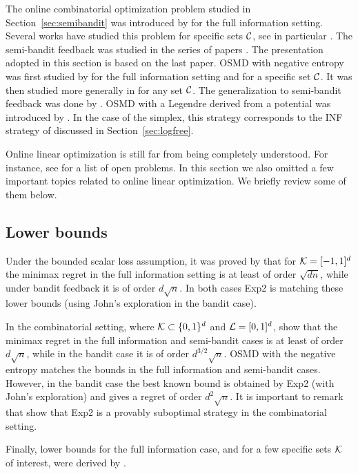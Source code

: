 The online combinatorial optimization problem studied in Section~\ref{sec:semibandit} was introduced by \cite{KV05} for the full information setting. Several works have studied this problem for specific sets $\mathcal{C}$, see in particular \cite{TW03, WK08, HW09, HKW10, KWK10, WKH11, CL11}. The semi-bandit feedback was studied in the series of papers \cite{GLLO07, KRS10, UNK10, ABL11}. The presentation adopted in this section is based on the last paper. OSMD with negative entropy was first studied by \cite{HW09} for the full information setting and for a specific set $\mathcal{C}$. It was then studied more generally in \cite{KWK10} for any set $\mathcal{C}$. The generalization to semi-bandit feedback was done by \cite{ABL11}. OSMD with a Legendre derived from a potential was introduced by \cite{ABL11}. In the case of the simplex, this strategy corresponds to the INF strategy of \cite{AB09} discussed in Section~\ref{sec:logfree}.

Online linear optimization is still far from being completely understood. For instance, see \cite[Chapter 9]{Bub11} for a list of open problems. In this section we also omitted a few important topics related to online linear optimization. We briefly review some of them below.

\subsection{Lower bounds}
Under the bounded scalar loss assumption, it was proved by \cite{DHK08} that for $\mathcal{K}=[-1,1]^d$ the minimax regret in the full information setting is at least of order $\sqrt{d n}$, while under bandit feedback it is of order $d \sqrt{n}$. In both cases Exp2 is matching these lower bounds (using John's exploration in the bandit case). 

In the combinatorial setting, where $\mathcal{K} \subset \{0,1\}^d$ and $\mathcal{L} = [0,1]^d$, \cite{ABL11} show that the minimax regret in the full information and semi-bandit cases is at least of order $d \sqrt{n}$, while in the bandit case it is of order $d^{3/2} \sqrt{n}$. OSMD with the negative entropy matches the bounds in the full information and semi-bandit cases. However, in the bandit case the best known bound is obtained by Exp2 (with John's exploration) and gives a regret of order $d^2 \sqrt{n}$. It is important to remark that \cite{ABL11} show that Exp2 is a provably suboptimal strategy in the combinatorial setting.

Finally, lower bounds for the full information case, and for a few specific sets $\mathcal{K}$ of interest, were derived by \cite{KWK10}.

